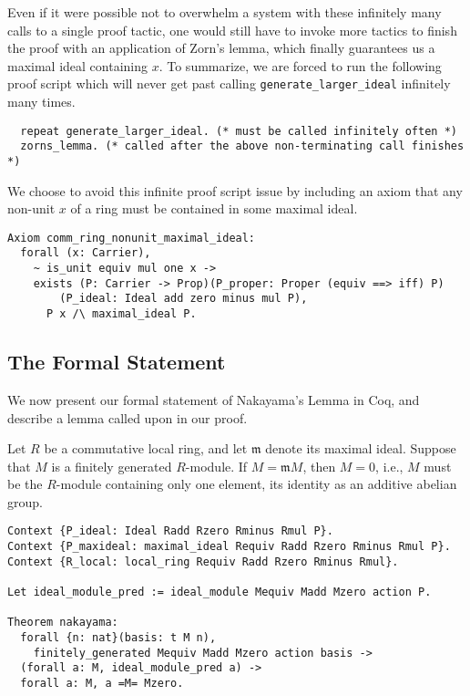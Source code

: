 \documentclass{article}
\begin{document}
Even if it were possible not to overwhelm a system with
these infinitely many calls to a single proof tactic, one would still have to
invoke more tactics to finish the proof with an application of Zorn's lemma,
which finally guarantees us a maximal ideal containing \(x\). To summarize, we
are forced to run the following proof script which will never get past calling
\texttt{generate_larger_ideal} infinitely many times.
\begin{verbatim}
  repeat generate_larger_ideal. (* must be called infinitely often *)
  zorns_lemma. (* called after the above non-terminating call finishes *)
\end{verbatim}

We choose to avoid this infinite proof script issue by including an axiom that
any non-unit \(x\) of a ring must be contained in some maximal ideal.

\begin{verbatim}
Axiom comm_ring_nonunit_maximal_ideal:
  forall (x: Carrier),
    ~ is_unit equiv mul one x ->
    exists (P: Carrier -> Prop)(P_proper: Proper (equiv ==> iff) P)
    	(P_ideal: Ideal add zero minus mul P),
      P x /\ maximal_ideal P.
\end{verbatim} 



\subsection{The Formal Statement} \label{formal-statement: SS}
We now present our formal statement of Nakayama's Lemma
in Coq, and describe a lemma called upon in our proof.

\begin{nak*}
Let $R$ be a commutative local ring, and let $\mathfrak{m}$ denote its maximal
ideal. Suppose that $M$ is a finitely generated $R$-module. If
$M = \mathfrak{m} M$, then $M = 0$, i.e., $M$ must be the $R$-module containing
only one element, its identity as an additive abelian group. 
\end{nak*}

\begin{verbatim}
Context {P_ideal: Ideal Radd Rzero Rminus Rmul P}.
Context {P_maxideal: maximal_ideal Requiv Radd Rzero Rminus Rmul P}.
Context {R_local: local_ring Requiv Radd Rzero Rminus Rmul}.
  
Let ideal_module_pred := ideal_module Mequiv Madd Mzero action P.

Theorem nakayama:
  forall {n: nat}(basis: t M n),
    finitely_generated Mequiv Madd Mzero action basis ->
  (forall a: M, ideal_module_pred a) ->
  forall a: M, a =M= Mzero.
\end{verbatim}
\end{document}
